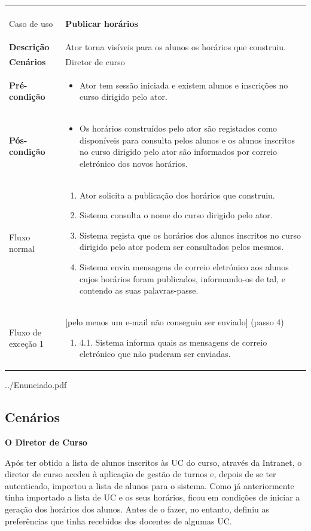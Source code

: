\documentclass[12pt, a4paper]{article}
\makeatletter
\renewcommand\section[1]{
    \newpage
    \thispagestyle{empty}
    \vspace*{\fill}
    \@startsection{section}{1}{\z@}{0px}{50px}{\normalfont\Huge\bfseries}{#1}
    \vspace*{\fill}
    \newpage
}
\newenvironment{condition}{
    \begin{itemize}[wide=0pt]
        \vspace{-0.2cm}
}{
        \vspace{-0.5cm}
    \end{itemize}
}
\newcommand\flow[1]{
    Fluxo normal &
    \vspace{-0.9cm}
    \singlespacing
    \begin{enumerate}[wide=0pt]
        #1
        \vspace{-0.3cm}
    \end{enumerate} \\ \hline
}
\newcommand\otherflow[3]{
    #1 &
    #2
    \singlespacing
    \begin{enumerate}[wide=0pt]
        #3
        \vspace{-0.3cm}
    \end{enumerate} \\ \hline
}
\newenvironment{usecase}[5]{
    \begin{longtable}{|>{\centering\arraybackslash\bf}m{3cm}|m{13cm}|}
        \multicolumn{2}{c}{\ldots Continua \ldots} \\
        \endfoot
        \endlastfoot

        \hline
        Caso de uso & \textbf{#1} \\

        \hline
        Descrição & #2 \\

        \hline
        Cenários & #3 \\

        \hline
        Pré-condição &
        \vspace{-0.8cm}
        \begin{condition}
            #4
        \end{condition} \\

        \hline
        Pós-condição &
        \vspace{-0.8cm}
        \begin{condition}
            #5
        \end{condition} \\

        \hline
}{
\end{longtable}
}
\makeatother
\begin{document}
\begin{usecase}
    {Publicar horários}
    {Ator torna visíveis para os alunos os horários que construiu.}
    {Diretor de curso}
    {\item Ator tem sessão iniciada e existem alunos e inscrições no curso dirigido pelo ator.}
    {
        \item Os horários construídos pelo ator são registados como disponíveis para consulta pelos
            alunos e os alunos inscritos no curso dirigido pelo ator são informados por correio
            eletrónico dos novos horários.
    }

    \flow{
        \item Ator solicita a publicação dos horários que construiu.
        \item Sistema consulta o nome do curso dirigido pelo ator.
        \item Sistema regista que os horários dos alunos inscritos no curso dirigido pelo ator podem
            ser consultados pelos mesmos.
        \item Sistema envia mensagens de correio eletrónico aos alunos cujos horários foram
            publicados, informando-os de tal, e contendo as suas palavras-passe.
    }

    \otherflow{Fluxo de exceção 1}{[pelo menos um e-mail não conseguiu ser enviado] (passo 4)}{
        \item[4.1.] Sistema informa quais as mensagens de correio eletrónico que não puderam ser
            enviadas.
    }
\end{usecase}

\section{Anexos}


    {../Enunciado.pdf}


\subsection{Cenários}
\label{use-cases}

\textbf{O Diretor de Curso}

Após ter obtido a lista de alunos inscritos às UC do curso, através da Intranet, o diretor de curso
acedeu à aplicação de gestão de turnos e, depois de se ter autenticado, importou a lista de alunos
para o sistema. Como já anteriormente tinha importado a lista de UC e os seus horários, ficou em
condições de iniciar a geração dos horários dos alunos. Antes de o fazer, no entanto, definiu as
preferências que tinha recebidos dos docentes de algumas UC.
\end{document}
